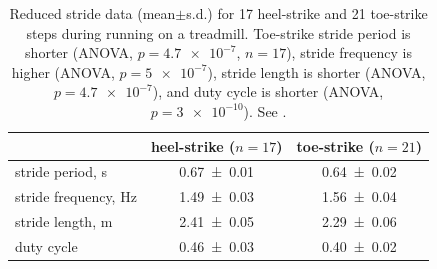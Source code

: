 \begin{table}[h]
\caption{Reduced stride data (mean$\pm$s.d.) for 17 heel-strike and 21 toe-strike steps during running on a treadmill. Toe-strike stride period is shorter (ANOVA, $p=\num{4.7e-7}$, $n=17$), stride frequency is higher (ANOVA, $p=\num{5e-7}$), stride length is shorter (ANOVA, $p=\num{4.7e-7}$), and duty cycle is shorter (ANOVA, $p=\num{3e-10}$). See .}
\label{tab:results:stride}
\begin{center}
\begin{tabular}{lcc}
\toprule
& heel-strike ($n=17$) & toe-strike ($n=21$)\\
\midrule 
stride period, \si{\second}   & \num{0.67\pm0.01} & \num{0.64\pm0.02} \\
stride frequency, \si{\hertz} & \num{1.49\pm0.03} & \num{1.56\pm0.04} \\
stride length, \si{\meter}    & \num{2.41\pm0.05} & \num{2.29\pm0.06} \\
duty cycle                    & \num{0.46\pm0.03} & \num{0.40\pm0.02} \\
\bottomrule
\end{tabular}
\end{center}
\end{table}

